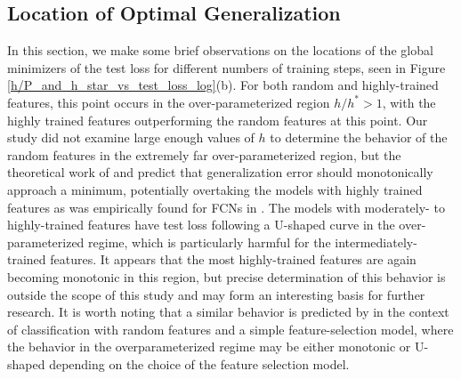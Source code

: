 \documentclass[11pt]{article}
\begin{document}
\subsection{Location of Optimal Generalization}

In this section, we make some brief observations on the locations of the global minimizers of the test loss for different numbers of training steps, seen in Figure \ref{h/P_and_h_star_vs_test_loss_log}(b). For both random and highly-trained features, this point occurs in the over-parameterized region $h/h^* > 1$, with the highly trained features outperforming the random features at this point. Our study did not examine large enough values of $h$ to determine the behavior of the random features in the extremely far over-parameterized region, but the theoretical work of \cite{meiGeneralizationErrorRandom2019} and \cite{dengModelDoubleDescent2020} predict that generalization error should monotonically approach a minimum, potentially overtaking the models with highly trained features as was empirically found for FCNs in \cite{geigerDisentanglingFeatureLazy2020}. The models with moderately- to highly-trained features have test loss following a U-shaped curve in the over-parameterized regime, which is particularly harmful for the intermediately-trained features. It appears that the most highly-trained features are again becoming monotonic in this region, but precise determination of this behavior is outside the scope of this study and may form an interesting basis for further research. It is worth noting that a similar behavior is predicted by \cite{dengModelDoubleDescent2020} in the context of classification with random features and a simple feature-selection model, where the behavior in the overparameterized regime may be either monotonic or U-shaped depending on the choice of the feature selection model.\\
\end{document}
